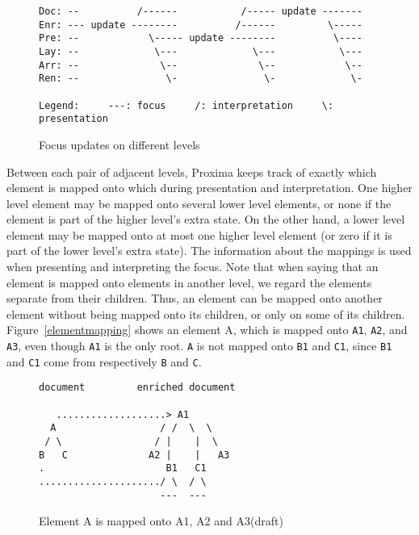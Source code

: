 \begin{figure}
\begin{small}
\begin{center}
\begin{verbatim}
Doc: --          /------           /----- update -------
Enr: --- update --------          /------         \-----
Pre: --            \----- update --------          \----
Lay: --             \---             \---           \---
Arr: --              \--              \--            \--
Ren: --               \-               \-             \-

Legend:     ---: focus     /: interpretation     \: presentation
\end{verbatim}
\caption{Focus updates on different levels}\label{focusUpdates} 
\end{center}
\end{small}
\end{figure}


Between each pair of adjacent levels, Proxima keeps track of exactly which element is mapped onto which during presentation and interpretation.  One higher level element may be mapped onto several lower level elements, or none if the element is part of the higher level's extra state. On the other hand, a lower level element may be mapped onto at most one higher level element (or zero if it is part of the lower level's extra state). The information about the mappings is used when presenting and interpreting the focus. Note that when saying that an element is mapped onto elements in another level, we regard the elements separate from their children. Thus, an element can be mapped onto another element without being mapped onto its children, or only on some of its children. Figure~\ref{elementmapping} shows an element A, which is mapped onto \verb|A1|, \verb|A2|, and \verb|A3|, even though \verb|A1| is the only root. \verb|A| is not mapped onto \verb|B1| and \verb|C1|, since \verb|B1| and \verb|C1| come from respectively \verb|B| and \verb|C|.  

\begin{figure}
\begin{small}
\begin{center}
\begin{verbatim}
document         enriched document

   ...................> A1
  A                  / /  \  \ 
 / \                / |    |  \ 
B   C              A2 |    |   A3
.                     B1   C1  
...................../ \  / \
                     ---  ---
\end{verbatim}
\caption{Element A is mapped onto A1, A2 and A3(draft)}\label{unpresentableFocus} 
\end{center}
\end{small}
\end{figure}

